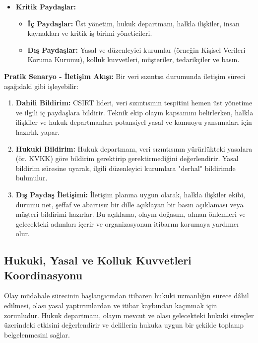 \begin{itemize}
    \item \textbf{Kritik Paydaşlar:}
    \begin{itemize}
        \item \textbf{İç Paydaşlar:} Üst yönetim, hukuk departmanı, halkla ilişkiler, insan kaynakları ve kritik iş birimi yöneticileri.
        \item \textbf{Dış Paydaşlar:} Yasal ve düzenleyici kurumlar (örneğin Kişisel Verileri Koruma Kurumu), kolluk kuvvetleri, müşteriler, tedarikçiler ve basın.
    \end{itemize}
\end{itemize}
\textbf{Pratik Senaryo - İletişim Akışı:}
Bir veri sızıntısı durumunda iletişim süreci aşağıdaki gibi işleyebilir:
\begin{enumerate}
    \item \textbf{Dahili Bildirim:} CSIRT lideri, veri sızıntısının tespitini hemen üst yönetime ve ilgili iç paydaşlara bildirir. Teknik ekip olayın kapsamını belirlerken, halkla ilişkiler ve hukuk departmanları potansiyel yasal ve kamuoyu yansımaları için hazırlık yapar.
    \item \textbf{Hukuki Bildirim:} Hukuk departmanı, veri sızıntısının yürürlükteki yasalara (ör. KVKK) göre bildirim gerektirip gerektirmediğini değerlendirir. Yasal bildirim süresine uyarak, ilgili düzenleyici kurumlara "derhal" bildirimde bulunulur.
    \item \textbf{Dış Paydaş İletişimi:} İletişim planına uygun olarak, halkla ilişkiler ekibi, durumu net, şeffaf ve abartısız bir dille açıklayan bir basın açıklaması veya müşteri bildirimi hazırlar. Bu açıklama, olayın doğasını, alınan önlemleri ve gelecekteki adımları içerir ve organizasyonun itibarını korumaya yardımcı olur.
\end{enumerate}

\subsection{Hukuki, Yasal ve Kolluk Kuvvetleri Koordinasyonu}

Olay müdahale sürecinin başlangıcından itibaren hukuki uzmanlığın sürece dâhil edilmesi, olası yasal yaptırımlardan ve itibar kaybından kaçınmak için zorunludur. Hukuk departmanı, olayın mevcut ve olası gelecekteki hukuki süreçler üzerindeki etkisini değerlendirir ve delillerin hukuka uygun bir şekilde toplanıp belgelenmesini sağlar.

